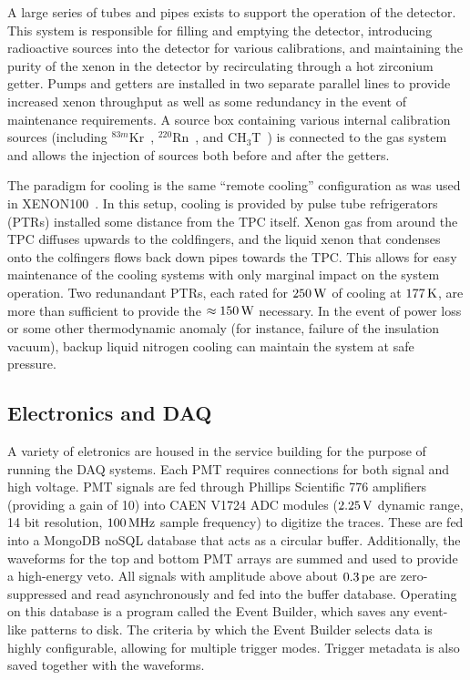 A large series of tubes and pipes exists to support the operation of the detector. This system is responsible for filling and emptying the detector, introducing radioactive sources into the detector for various calibrations, and maintaining the purity of the xenon in the detector by recirculating through a hot zirconium getter. Pumps and getters are installed in two separate parallel lines to provide increased xenon throughput as well as some redundancy in the event of maintenance requirements. A source box containing various internal calibration sources (including $^{83m}$Kr~\cite{Kastens:2010,Akerib:2017eql}, $^{220}$Rn~\cite{Aprile:2016pmc,Lang:2016zde}, and CH$_3$T~\cite{Akerib:2015wdi}) is connected to the gas system and allows the injection of sources both before and after the getters.

The paradigm for cooling is the same ``remote cooling'' configuration as was used in XENON100~\cite{Aprile:2011dd}. In this setup, cooling is provided by pulse tube refrigerators (PTRs) installed some distance from the TPC itself. Xenon gas from around the TPC diffuses upwards to the coldfingers, and the liquid xenon that condenses onto the colfingers flows back down pipes towards the TPC. This allows for easy maintenance of the cooling systems with only marginal impact on the system operation. Two redunandant PTRs, each rated for $250\, \mathrm{W}$ of cooling at $177\, \mathrm{K}$, are more than sufficient to provide the $\approx 150\, \mathrm{W}$ necessary. In the event of power loss or some other thermodynamic anomaly (for instance, failure of the insulation vacuum), backup liquid nitrogen cooling can maintain the system at safe pressure.

\subsection{Electronics and DAQ}

A variety of eletronics are housed in the service building for the purpose of running the DAQ systems. Each PMT requires connections for both signal and high voltage. PMT signals are fed through Phillips Scientific 776 amplifiers (providing a gain of 10) into CAEN V1724 ADC modules ($2.25\, \mathrm{V}$ dynamic range, 14 bit resolution, $100\, \mathrm{MHz}$ sample frequency) to digitize the traces. These are fed into a MongoDB noSQL database that acts as a circular buffer. Additionally, the waveforms for the top and bottom PMT arrays are summed and used to provide a high-energy veto. All signals with amplitude above about $0.3\, \mathrm{pe}$ are zero-suppressed and read asynchronously and fed into the buffer database. Operating on this database is a program called the Event Builder, which saves any event-like patterns to disk. The criteria by which the Event Builder selects data is highly configurable, allowing for multiple trigger modes. Trigger metadata is also saved together with the waveforms.

